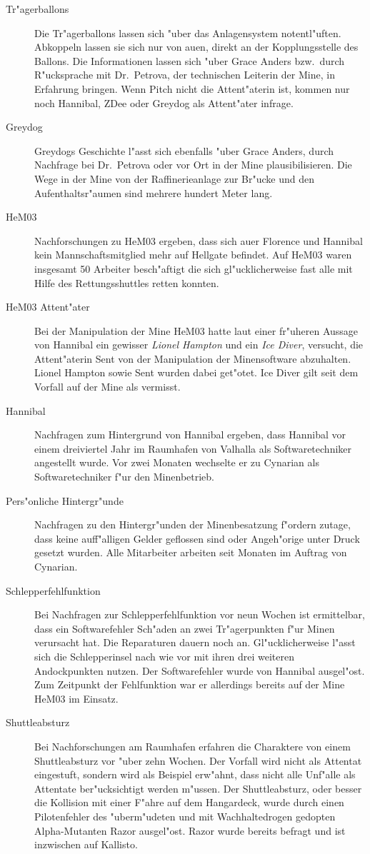 \begin{description}
	\item[Tr"agerballons] Die Tr"agerballons lassen sich "uber das Anlagensystem notentl"uften. Abkoppeln lassen sie sich nur von au\3en, direkt 
		an der Kopplungsstelle des Ballons. Die Informationen lassen sich "uber Grace Anders bzw.~durch R"ucksprache mit Dr.~Petrova, der technischen Leiterin der Mine, in Erfahrung bringen. Wenn Pitch nicht die Attent"aterin ist, kommen nur noch Hannibal, ZDee oder Greydog als Attent"ater infrage.
	\item[Greydog] Greydogs Geschichte l"asst sich ebenfalls "uber Grace Anders, durch Nachfrage bei Dr.~Petrova oder vor Ort in der Mine 
		plausibilisieren. Die Wege in der Mine von der Raffinerieanlage zur Br"ucke und den Aufenthaltsr"aumen sind mehrere hundert Meter lang.
	\item[HeM03] Nachforschungen zu HeM03 ergeben, dass sich au\3er Florence und Hannibal kein Mannschaftsmitglied mehr auf Hellgate befindet. Auf HeM03 waren insgesamt 50 Arbeiter besch"aftigt die sich gl"ucklicherweise fast alle mit Hilfe des Rettungsshuttles retten konnten. 
	\item[HeM03 Attent"ater] Bei der Manipulation der Mine HeM03 hatte laut einer fr"uheren Aussage von Hannibal ein gewisser \emph{Lionel 
		Hampton} und ein \emph{Ice Diver}, versucht, die Attent"aterin Sent von der Manipulation der Minensoftware abzuhalten. Lionel Hampton sowie Sent wurden dabei get"otet. Ice Diver gilt seit dem Vorfall auf der Mine als vermisst.
	\item[Hannibal] Nachfragen zum Hintergrund von Hannibal ergeben, dass Hannibal vor einem dreiviertel Jahr im Raumhafen von Valhalla als 
		Softwaretechniker angestellt wurde. Vor zwei Monaten wechselte er zu Cynarian als Softwaretechniker f"ur den Minenbetrieb.
	\item[Pers"onliche Hintergr"unde] Nachfragen zu den Hintergr"unden der Minenbesatzung f"ordern zutage, dass keine auff"alligen Gelder 
		geflossen sind oder Angeh"orige unter Druck gesetzt wurden. Alle Mitarbeiter arbeiten seit Monaten im Auftrag von Cynarian.
	\item[Schlepperfehlfunktion] Bei Nachfragen zur Schlepperfehlfunktion vor neun Wochen ist ermittelbar, dass ein Softwarefehler Sch"aden 
		an zwei Tr"agerpunkten f"ur Minen verursacht hat. Die Reparaturen dauern noch an. Gl"ucklicherweise l"asst sich die Schlepperinsel nach wie vor mit ihren drei weiteren Andockpunkten nutzen. Der Softwarefehler wurde von Hannibal ausgel"ost. Zum Zeitpunkt der Fehlfunktion war er allerdings bereits auf der Mine HeM03 im Einsatz.
	\item[Shuttleabsturz] Bei Nachforschungen am Raumhafen erfahren die Charaktere von einem Shuttleabsturz vor "uber zehn Wochen. Der 
		Vorfall wird nicht als Attentat eingestuft, sondern wird als Beispiel erw"ahnt, dass nicht alle Unf"alle als Attentate ber"ucksichtigt werden m"ussen. Der Shuttleabsturz, oder besser die Kollision mit einer F"ahre auf dem Hangardeck, wurde durch einen Pilotenfehler des "uberm"udeten und mit Wachhaltedrogen gedopten Alpha-Mutanten Razor ausgel"ost. Razor wurde bereits befragt und ist inzwischen auf Kallisto.
\end{description}

